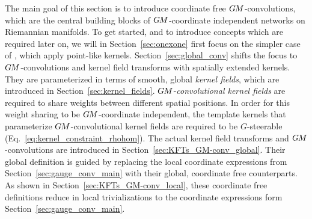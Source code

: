The main goal of this section is to introduce coordinate free $G\mkern-1.4muM$-convolutions, which are the central building blocks of $G\mkern-1.4muM$-coordinate independent networks on Riemannian manifolds.
To get started, and to introduce concepts which are required later on, we will in Section~\ref{sec:onexone} first focus on the simpler case of \onexoneGMsit, which apply point-like kernels.
Section~\ref{sec:global_conv} shifts the focus to $G\mkern-1.4muM$-convolutions and kernel field transforms with spatially extended kernels.
They are parameterized in terms of smooth, global \emph{kernel fields}, which are introduced in Section~\ref{sec:kernel_fields}.
$G\mkern-1.4muM$-\emph{convolutional kernel fields} are required to share weights between different spatial positions.
In order for this weight sharing to be $G\mkern-1.4muM$-coordinate independent, the template kernels that parameterize $G\mkern-1.4muM$-convolutional kernel fields are required to be $G$-steerable (Eq.~\eqref{eq:kernel_constraint_rhohom}).
The actual kernel field transforms and $G\mkern-1.4muM$-convolutions are introduced in Section~\ref{sec:KFTs_GM-conv_global}.
Their global definition is guided by replacing the local coordinate expressions from Section~\ref{sec:gauge_conv_main} with their global, coordinate free counterparts.
As shown in Section~\ref{sec:KFTs_GM-conv_local}, these coordinate free definitions reduce in local trivializations to the coordinate expressions form Section~\ref{sec:gauge_conv_main}.
